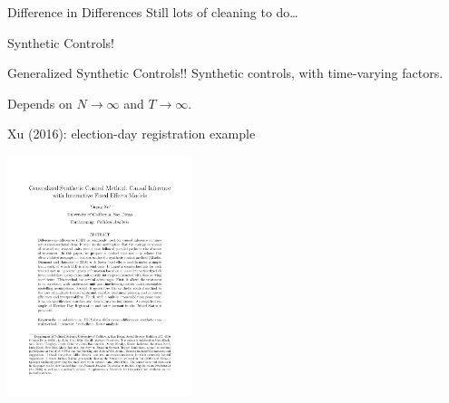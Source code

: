 \documentclass[aspectratio=169]{beamer}
\begin{document}
\begin{frame}{Difference in Differences}
	Still lots of cleaning to do\ldots
\end{frame}

{
\begin{frame}[plain]
\end{frame}
}

\begin{frame}{Synthetic Controls!}
\end{frame}


\begin{frame}{Generalized Synthetic Controls!!}
	Synthetic controls, with time-varying factors.

	Depends on $N\to\infty$ and $T\to\infty$.
\end{frame}

\begin{frame}{Xu (2016): election-day registration example}
	\vspace*{-0.1cm}
	\begin{center}
		\includegraphics[page=25, trim = 2.5cm 15.5cm 2.0cm 3.0cm, clip,height=7cm]{../../Papers/Econometrics/Xu_2016.pdf}
	\end{center}
\end{frame}
\end{document}
